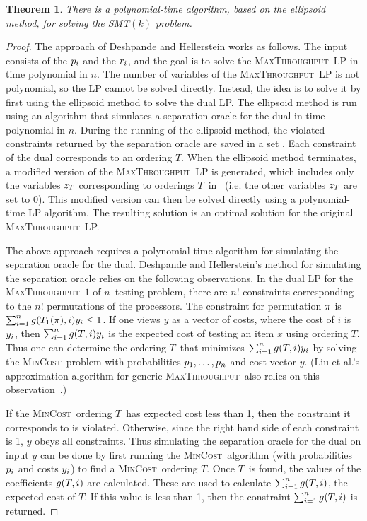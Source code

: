 \documentclass{article}
\newcounter{thmcount}
\newtheorem{thm}[thmcount]{Theorem}
\newcommand{\ens}[1]{\ensuremath{#1}}					\newcommand{\card}[1]{\ens{|#1|}}							\newcommand{\dotlist}[2]{\ens{#1,\ldots,#2}}
\newcommand{\anitem}{\ens{x}}
\newcommand{\valn}{\ens{n}}
\newcommand{\valk}{\ens{k}}
\newcommand{\maxthru}{\textsc{MaxThroughput}}
\newcommand{\mincost}{\textsc{MinCost}}
\newcommand{\oneofn}{$1$-of-\valn}
\newcommand{\strategy}{\ens{T}}
\newcommand{\processor}{processor}
\newcommand{\smt}{\textsf{SMT}$(\valk)$ problem}				\newcommand{\cmt}{\textsf{CMT}$(\valk)$ problem}
\begin{document}
\begin{thm}
\label{thm:smt}
There is a polynomial-time algorithm, based on the ellipsoid method, for
solving the \smt.
\end{thm}

\begin{proof} 
The  approach of Deshpande and Hellerstein works as follows.  The input consists of
the $\pr i$ and the $\rate i$, and the goal is to solve the
\maxthru\ LP in time polynomial in \valn.
The number of variables of the \maxthru\ LP is not
polynomial, so the LP cannot be 
solved directly.
Instead, the idea is to solve it by first using 
the ellipsoid method to solve the dual LP.
The ellipsoid method is
run using an algorithm that simulates a separation oracle
for the dual in time polynomial in \valn.
During the running of the ellipsoid method, the violated
constraints returned by the separation oracle are saved
in a set \loadratio.  Each constraint of the dual corresponds
to an ordering \strategy.  When the ellipsoid method terminates,
a modified version of the \maxthru\ LP is generated,
which includes only the variables $\varz{\strategy}$ corresponding to
orderings \strategy\ in \loadratio\ (i.e. the other variables $\varz{\strategy}$ are
set to 0).  This modified version can then be solved 
directly using a polynomial-time LP algorithm.
The resulting solution is an optimal
solution for the original \maxthru\ LP.

The above approach requires 
a polynomial-time algorithm for simulating the separation oracle
for the dual.  
Deshpande and Hellerstein's method for simulating the
separation oracle relies on the following observations.
In the dual LP for the
\maxthru\, \oneofn\ testing problem,
there are $n!$ constraints corresponding to the
$n!$ permutations of the {\processor}s.
The constraint for permutation $\perm$
is
$\sum_{i=1}^n \landprob{\strategy_1(\pi)}{i}\vary{i} \leq 1$.
If one views $y$ as a vector of costs, where the cost of $i$
is $\vary{i}$, then 
$\sum_{i=1}^n \landprob{\strategy}{i}\vary{i}$  is the expected cost of testing
an item \anitem{} using ordering \strategy.
Thus one can determine the ordering \strategy\ that minimizes
$\sum_{i=1}^n \landprob{\strategy}{i}\vary{i}$
by solving the \mincost\ problem with probabilities
$\pr 1, \ldots, \pr{\valn}$ and cost vector $y$.
(Liu et al.'s approximation algorithm for generic
\maxthru\ also relies on this observation~\cite{conf/pods/LiuPRY08}.)

If the \mincost\ ordering \strategy\ has expected cost
less than 1, then the constraint it corresponds to is
violated.  Otherwise, since the right hand side of
each constraint is 1, $y$ obeys all constraints.
Thus simulating the separation oracle for
the dual on input $y$ can be done by
first running the \mincost\ algorithm (with probabilities $\pr i$ and costs
$\vary{i}$) to find a \mincost\ ordering \strategy.  Once \strategy\ is found,
the values of the coefficients $\landprob{\strategy}{i}$ are calculated.
These are used to calculate
$\sum_{i=1}^n \landprob{\strategy}{i}$, the expected cost of \strategy.  If this value
is less than 1, then the constraint
$\sum_{i=1}^n \landprob{\strategy}{i}$ is returned.


\end{proof}
\end{document}
